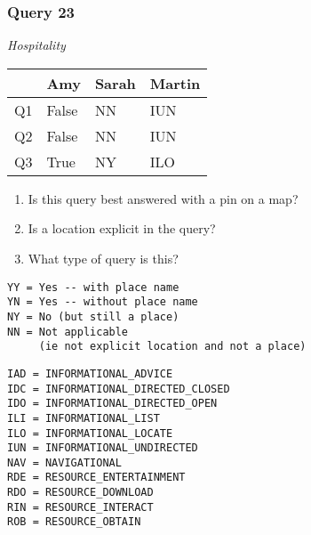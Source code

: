 \begin{frame}[fragile]
\frametitle{Query 23}
\vspace{1em}

\emph{Hospitality}

\vfill

\begin{table}
  \centering
  \begin{tabular}{ l l l l }
    & \textbf{Amy} & \textbf{Sarah} & \textbf{Martin}\\
    \toprule
    Q1 & False & NN & IUN\\
Q2 & False & NN & IUN\\
Q3 & True & NY & ILO\\
    \bottomrule
  \end{tabular}
\end{table}

\vfill

\tiny{

\begin{enumerate}
\item Is this query best answered with a pin on a map?
\item Is a location explicit in the query?
\item What type of query is this?
\end{enumerate}

\vfill

\begin{multicols}{2}
\begin{verbatim}
YY = Yes -- with place name
YN = Yes -- without place name
NY = No (but still a place)
NN = Not applicable 
     (ie not explicit location and not a place)
\end{verbatim}

\columnbreak
\begin{verbatim}
IAD = INFORMATIONAL_ADVICE
IDC = INFORMATIONAL_DIRECTED_CLOSED
IDO = INFORMATIONAL_DIRECTED_OPEN
ILI = INFORMATIONAL_LIST
ILO = INFORMATIONAL_LOCATE
IUN = INFORMATIONAL_UNDIRECTED
NAV = NAVIGATIONAL
RDE = RESOURCE_ENTERTAINMENT
RDO = RESOURCE_DOWNLOAD
RIN = RESOURCE_INTERACT
ROB = RESOURCE_OBTAIN
\end{verbatim}
\end{multicols}
}

\end{frame}


